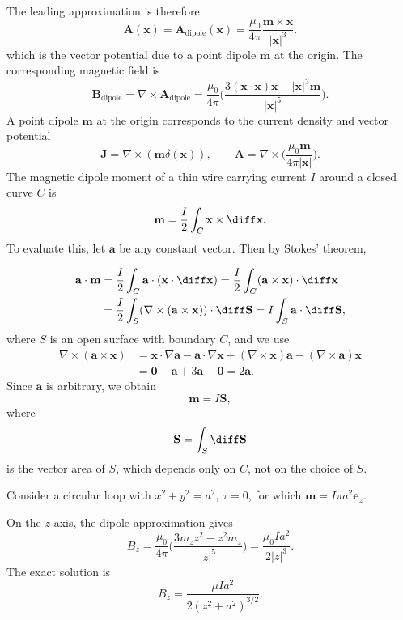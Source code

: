 \documentclass[12pt]{article}
\begin{document}
The leading approximation is therefore
\[
	\mathbf{A}(\mathbf{x}) = \mathbf{A}_{\mathrm{dipole}}(\mathbf{x}) = \frac{\mu_0}{4 \pi} \frac{\mathbf{m} \times \mathbf{x}}{|\mathbf{x}|^3}
.\]
which is the vector potential due to a point dipole $\mathbf{m}$ at the origin. The corresponding magnetic field is
\[
	\mathbf{B}_{\mathrm{dipole}} = \nabla \times \mathbf{A}_{\mathrm{dipole}} = \frac{\mu_0}{4 \pi} \biggl( \frac{3(\mathbf{x} \cdot \mathbf{x})\mathbf{x} - |\mathbf{x}|^3 \mathbf{m}}{|\mathbf{x}|^{5}} \biggr)
.\]
A point dipole $\mathbf{m}$ at the origin corresponds to the current density and vector potential
\[
\mathbf{J} = \nabla \times (\mathbf{m} \delta(\mathbf{x})), \qquad \mathbf{A} = \nabla \times \biggl( \frac{\mu_0 \mathbf{m}}{4 \pi |\mathbf{x}|} \biggr)
.\]
The magnetic dipole moment of a thin wire carrying current $I$ around a closed curve $C$ is
\[
\mathbf{m} = \frac{I}{2} \int_{C} \mathbf{x} \times \diff \mathbf{x}
.\]
To evaluate this, let $\mathbf{a}$ be any constant vector. Then by Stokes' theorem,

\begin{align*}
	\mathbf{a} \cdot \mathbf{m} &= \frac{I}{2} \int_{C} \mathbf{a} \cdot (\mathbf{x} \cdot \diff \mathbf{x}) = \frac{I}{2} \int_{C} (\mathbf{a} \times \mathbf{x}) \cdot \diff \mathbf{x} \\
				    &= \frac{I}{2} \int_{S}(\nabla \times(\mathbf{a} \times \mathbf{x})) \cdot \diff \mathbf{S} = I \int_{S} \mathbf{a} \cdot \diff \mathbf{S},
\end{align*}
where $S$ is an open surface with boundary $C$, and we use
\begin{align*}
	\nabla \times (\mathbf{a} \times \mathbf{x}) &= \mathbf{x} \cdot \nabla \mathbf{a} - \mathbf{a} \cdot \nabla \mathbf{x} + (\nabla \times \mathbf{x})\mathbf{a} - (\nabla \times \mathbf{a})\mathbf{x} \\
						     &= \mathbf{0} - \mathbf{a} + 3 \mathbf{a} - \mathbf{0} = 2 \mathbf{a}.
\end{align*}
Since $\mathbf{a}$ is arbitrary, we obtain
\[
\mathbf{m} = I \mathbf{S}
,\]
where
 \[
\mathbf{S} = \int_{S} \diff \mathbf{S}
\]
is the vector area of $S$, which depends only on $C$, not on the choice of $S$.

\begin{exbox}
	Consider a circular loop with $x^2 + y^2 = a^2$, $\tau = 0$, for which $\mathbf{m} = I \pi a^2 \mathbf{e}_z$.

	On the $z$-axis, the dipole approximation gives
	\[
	B_z = \frac{\mu_0}{4 \pi} \biggl( \frac{3m_z z^2 - z^2 m_z}{|z|^{5}} \biggr) = \frac{\mu_0 I a^2}{2|z|^3}
	.\]
	The exact solution is
	\[
		B_z = \frac{\mu I a^2}{2(z^2 + a^2)^{3/2}}
	.\]
\end{exbox}
\end{document}

